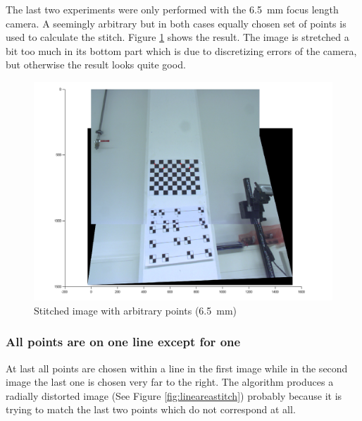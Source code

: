 \documentclass[
a4paper,     %
12pt         %
]{scrartcl}  %
\begin{document}
The last two experiments were only performed with the \SI{6.5}{mm} focus length camera.
A seemingly arbitrary but in both cases equally chosen set of points is used to calculate the stitch.
Figure \ref{fig:arbitraryareastitch} shows the result.
The image is stretched a bit too much in its bottom part which is due to discretizing errors of the camera, but otherwise the result looks quite good.

\begin{figure}[ht!]
 \centering
 \includegraphics[scale=0.4]{./Bildg_Messtechnik_Lab/PanoramaStitching/figb4.png}
 \caption{Stitched image with arbitrary points (\SI{6.5}{mm})}
 \label{fig:arbitraryareastitch}
\end{figure}

\subsubsection{All points are on one line except for one}

At last all points are chosen within a line in the first image while in the second image the last one is chosen very far to the right.
The algorithm produces a radially distorted image (See Figure  \ref{fig:lineareastitch}) probably because it is trying to match the last two points which do not correspond at all.
\end{document}
